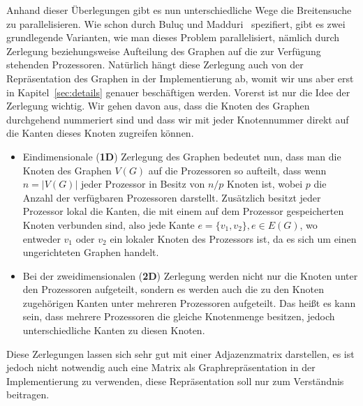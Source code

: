 \documentclass[11pt,a4paper]{article}
\begin{document}
Anhand dieser Überlegungen gibt es nun unterschiedliche Wege die Breitensuche zu parallelisieren. Wie schon durch Buluç und Madduri~\cite{buluc} spezifiert, gibt es zwei grundlegende Varianten, wie man dieses Problem parallelisiert, nämlich durch Zerlegung beziehungsweise Aufteilung des Graphen auf die zur Verfügung stehenden Prozessoren. Natürlich hängt diese Zerlegung auch von der Repräsentation des Graphen in der Implementierung ab, womit wir uns aber erst in Kapitel~\ref{sec:details} genauer beschäftigen werden. Vorerst ist nur die Idee der Zerlegung wichtig. Wir gehen davon aus, dass die Knoten des Graphen durchgehend nummeriert sind und dass wir mit jeder Knotennummer direkt auf die Kanten dieses Knoten zugreifen können.
\begin{itemize}
	\item{Eindimensionale (\textbf{1D}) Zerlegung des Graphen bedeutet nun, dass man die Knoten des Graphen \(V(G)\) auf die Prozessoren so aufteilt, dass wenn \(n = |V(G)|\) jeder Prozessor in Besitz von \(n / p\) Knoten ist, wobei \(p\) die Anzahl der verfügbaren Prozessoren darstellt. Zusätzlich besitzt jeder Prozessor lokal die Kanten, die mit einem auf dem Prozessor gespeicherten Knoten verbunden sind, also jede Kante \(e = \{v_{1},v_{2}\}, e \in E(G)\), wo entweder \(v_{1}\) oder \(v_{2}\) ein lokaler Knoten des Prozessors ist, da es sich um einen ungerichteten Graphen handelt.}
	\item{Bei der zweidimensionalen (\textbf{2D})  Zerlegung werden nicht nur die Knoten unter den Prozessoren aufgeteilt, sondern es werden auch die zu den Knoten zugehörigen Kanten unter mehreren Prozessoren aufgeteilt. Das heißt es kann sein, dass mehrere Prozessoren die gleiche Knotenmenge besitzen, jedoch unterschiedliche Kanten zu diesen Knoten.}
\end{itemize}
Diese Zerlegungen lassen sich sehr gut mit einer Adjazenzmatrix darstellen, es ist jedoch nicht notwendig auch eine Matrix als Graphrepräsentation in der Implementierung zu verwenden, diese Repräsentation soll nur zum Verständnis beitragen.
\end{document}
